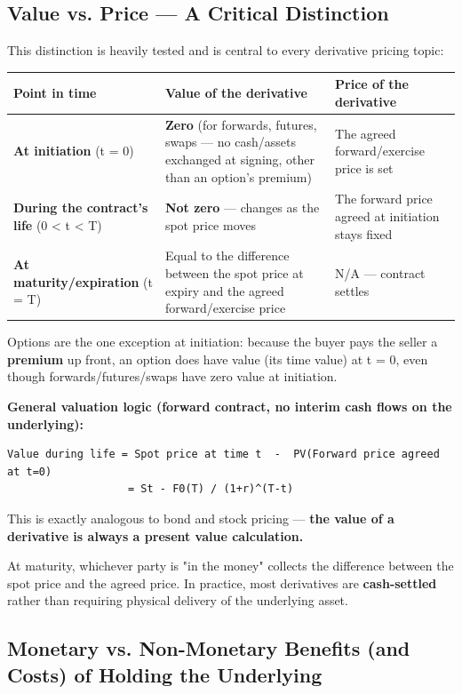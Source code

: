 \documentclass[12pt,openany]{book}
\theoremstyle{definition}
\theoremstyle{remark}
\begin{document}
\subsection{Value vs. Price — A Critical Distinction}

This distinction is heavily tested and is central to every derivative pricing topic:

{\small
\begin{longtable}{@{}L{0.18\textwidth}L{0.34\textwidth}L{0.38\textwidth}@{}}
\toprule
\textbf{Point in time} & \textbf{Value of the derivative} & \textbf{Price of the derivative} \\
\midrule
\textbf{At initiation} (t = 0) & \textbf{Zero} (for forwards, futures, swaps — no cash/assets exchanged at signing, other than an option's premium) & The agreed forward/exercise price is set \\
\textbf{During the contract's life} (0 < t < T) & \textbf{Not zero} — changes as the spot price moves & The forward price agreed at initiation stays fixed \\
\textbf{At maturity/expiration} (t = T) & Equal to the difference between the spot price at expiry and the agreed forward/exercise price & N/A — contract settles \\
\bottomrule
\end{longtable}
}

Options are the one exception at initiation: because the buyer pays the seller a \textbf{premium} up front, an option does have value (its time value) at t = 0, even though forwards/futures/swaps have zero value at initiation.

\textbf{General valuation logic (forward contract, no interim cash flows on the underlying):}

\begin{lstlisting}[style=notesCode]
Value during life = Spot price at time t  -  PV(Forward price agreed at t=0)
                   = St - F0(T) / (1+r)^(T-t)
\end{lstlisting}

This is exactly analogous to bond and stock pricing — \textbf{the value of a derivative is always a present value calculation.}

At maturity, whichever party is "in the money" collects the difference between the spot price and the agreed price. In practice, most derivatives are \textbf{cash-settled} rather than requiring physical delivery of the underlying asset.

\subsection{Monetary vs. Non-Monetary Benefits (and Costs) of Holding the Underlying}
\end{document}
